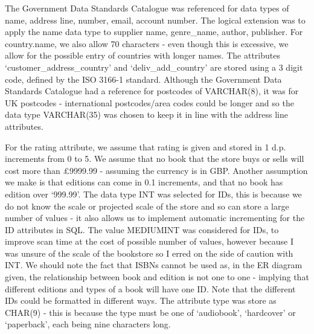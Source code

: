 The Government Data Standards Catalogue\cite{dataStandards} was referenced for data types of name, address line, number, email, account number. The logical extension was to apply the name data type to supplier name, genre\_name, author, publisher. For country.name, we also allow 70 characters - even though this is excessive, we allow for the possible entry of countries with longer names. The attributes `customer\_address\_country' and `deliv\_add\_country' are stored using a 3 digit code, defined by the ISO 3166-1 standard\cite{iso}. Although the Government Data Standards Catalogue had a reference for postcodes of VARCHAR(8), it was for UK postcodes - international postcodes/area codes could be longer and so the data type VARCHAR(35) was chosen to keep it in line with the address line attributes.

For the rating attribute, we assume that rating is given and stored in 1 d.p. increments from 0 to 5. We assume that no book that the store buys or sells will cost more than £9999.99 - assuming the currency is in GBP. Another assumption we make is that editions can come in 0.1 increments, and that no book has edition over `999.99'. The data type INT was selected for IDs, this is because we do not know the scale or projected scale of the store and so can store a large number of values - it also allows us to implement automatic incrementing for the ID attributes in SQL. The value MEDIUMINT was considered for IDs, to improve scan time at the cost of possible number of values, however because I was unsure of the scale of the bookstore so I erred on the side of caution with INT. We should note the fact that ISBNs cannot be used as, in the ER diagram given, the relationship between book and edition is not one to one - implying that different editions and types of a book will have one ID. Note that the different IDs could be formatted in different ways. The attribute type was store as CHAR(9) - this is because the type must be one of `audiobook', `hardcover' or `paperback', each being nine characters long. 
